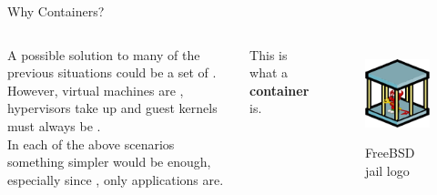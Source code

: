 \begin{frame}{Why Containers?}
\begin{columns}
  A possible solution to many of the previous situations could be a set of .\\
  However, virtual machines are , hypervisors take up  and guest kernels must always be .\\
  In each of the above scenarios something simpler would be enough, especially since , only applications are.\\
  \begin{block}{}
    \centering
    This is what a \textbf{container} is.
  \end{block}

  \begin{figure}
    \centering
    \includegraphics[scale=.7]{freebsdjail.png}
    \label{fig:jail}
    \caption{FreeBSD jail logo}
  \end{figure}
\end{columns}
\end{frame}

